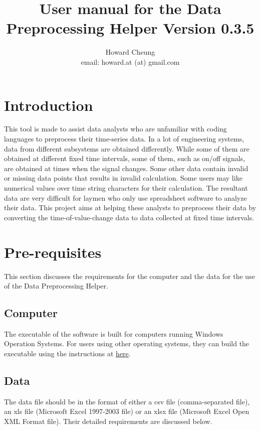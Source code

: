 \documentclass[12pt,a4paper]{article}
\author{Howard Cheung \\ email: howard.at (at) gmail.com }
\title{User manual for the Data Preprocessing Helper Version 0.3.5}
\begin{document}
\maketitle

\tableofcontents

\section{Introduction}

This tool is made to assist data analysts who are unfamiliar with coding languages to preprocess their time-series data.
In a lot of engineering systems, data from different subsystems are obtained differently.
While some of them are obtained at different fixed time intervals, some of them, such as on/off signals, are obtained at times when the signal changes.
Some other data contain invalid or missing data points that results in invalid calculation.
Some users may like numerical values over time string characters for their calculation.
The resultant data are very difficult for laymen who only use spreadsheet software to analyze their data.
This project aims at helping these analysts to preprocess their data by converting the time-of-value-change data to data collected at fixed time intervals.

\section{Pre-requisites}
This section discusses the requirements for the computer and the data for the use of the Data Preprocessing Helper.

\subsection{Computer}
The executable of the software is built for computers running Windows Operation Systems.
For users using other operating systems, they can build the executable using the instructions at \href{https://github.com/howardcheung/data-preprocessing-helper/blob/master/exe/README.md}{here}.

\subsection{Data}
The data file should be in the format of either a csv file (comma-separated file), an xls file (Microsoft Excel 1997-2003 file) or an xlsx file (Microsoft Excel Open XML Format file). Their detailed requirements are discussed below.
\end{document}
